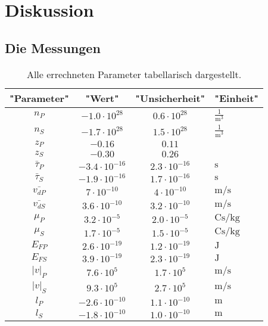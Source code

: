 \section{Diskussion}
\subsection{Die Messungen}
\begin{table}[H]
  \centering
    \caption{Alle errechneten Parameter tabellarisch dargestellt.}
    \label{tab:disskussion1}
    \begin{tabular}{S S S}
      \toprule
      {"Parameter"} & {"Wert"} & {"Unsicherheit"} & {"Einheit"} \\
      \midrule
      $n_{P}$ & $-1.0 \cdot 10^{28}$ &  $0.6 \cdot 10^{28}$ & $\frac{1}{\si{\cubic\meter}}$\\
      $n_{S}$ & $-1.7 \cdot 10^{28}$ &  $1.5 \cdot 10^{28}$ & $\frac{1}{\si{\cubic\meter}}$\\
      $z_{P}$ & $-0.16$ &  $0.11$ & \\
      $z_{S}$ & $-0.30$ &  $0.26$ & \\
      $\bar{\tau}_{P}$ & $-3.4 \cdot 10^{-16}$ & $2.3 \cdot 10^{-16}$ & $\si{\second}$\\
      $\bar{\tau}_{S}$ & $-1.9 \cdot 10^{-16}$ & $1.7 \cdot 10^{-16}$ & $\si{\second}$\\
      $\bar{v_{dP}}$  & $7 \cdot 10^{-10}$ & $4 \cdot 10^{-10}$ & $\si{\meter\per\second}$\\
      $\bar{v_{dS}}$  & $3.6 \cdot 10^{-10}$ & $3.2 \cdot 10^{-10}$ & $\si{\meter\per\second}$\\
      $\mu_{P}$ & $3.2 \cdot 10^{-5}$ & $2.0 \cdot 10^{-5}$ & $\si{\coulomb\second\per\kilo\gram}$ \\
      $\mu_{S}$ & $1.7 \cdot 10^{-5}$ & $1.5 \cdot 10^{-5}$ & $\si{\coulomb\second\per\kilo\gram}$ \\
      $E_{FP}$ & $2.6 \cdot 10^{-19}$ & $1.2 \cdot 10^{-19}$ & $\si{\joule}$ \\
      $E_{FS}$ & $3.9 \cdot 10^{-19}$ & $2.3 \cdot 10^{-19}$ & $\si{\joule}$\\
      $|v|_{P}$ & $7.6 \cdot 10^{5}$ & $1.7 \cdot 10^{5}$ & $\si{\meter\per\second}$ \\
      $|v|_{S}$ & $9.3 \cdot 10^{5}$ & $2.7 \cdot 10^{5}$ & $\si{\meter\per\second}$ \\
      $l_{P}$ & $-2.6 \cdot 10^{-10}$ & $1.1 \cdot 10^{-10}$ & $\si{\meter}$ \\
      $l_{S}$ & $-1.8 \cdot 10^{-10}$ & $1.0 \cdot 10^{-10}$ & $\si{\meter}$ \\
      \bottomrule
    \end{tabular}
  \end{table}
